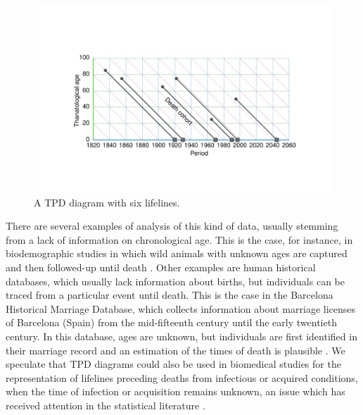 \documentclass[12pt,oneside,a4paper]{article} %
\theoremstyle{definition}
\begin{document}
\begin{figure}[h!] 
\caption{A TPD diagram with six lifelines.}
\label{fig:TPD}
\centering
\includegraphics[scale=0.8]{Figures/TPDrt.pdf}
\end{figure} 
There are several examples of analysis of this kind of data, usually stemming
from a lack of information on chronological age. This is the case, for instance,
in biodemographic studies in which wild animals with unknown ages are captured
and then followed-up until death \cite{muller2004demographic,
muller2007survival}. Other examples are human historical databases, which
usually lack information about births, but individuals can be traced from a
particular event until death. This is the case in the Barcelona Historical
Marriage Database, which collects information about marriage licenses of
Barcelona (Spain) from the mid-fifteenth century until the early twentieth
century. In this database, ages are unknown, but individuals are first
identified in their marriage record and an estimation of the times of death is
plausible \citep{villavicencio2015reconstructing}. We speculate that TPD
diagrams could also be used in biomedical studies for the representation of
lifelines preceding deaths from infectious or acquired conditions, when the time
of infection or acquisition remains unknown, an issue which has received
attention in the statistical literature \citep[see e.g.][]{chan2010backward}.
\end{document}
